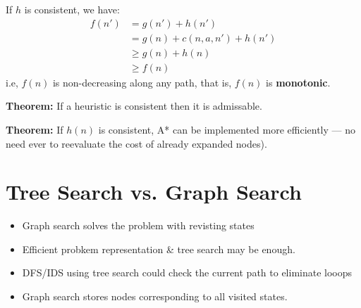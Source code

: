 \documentclass{article}
\begin{document}
If $h$ is consistent, we have:
\begin{align*}
	f(n') &= g(n') + h(n') \\
		&= g(n) + c(n,a,n') + h(n') \\
		&\ge g(n) + h(n) \\
		&\ge f(n)
\end{align*}
i.e, $f(n)$ is non-decreasing along any path, that is, $f(n)$ is \textbf{monotonic}.

\smallskip
\textbf{Theorem:} If a heuristic is consistent then it is admissable.

\smallskip
\textbf{Theorem:} If $h(n)$ is consistent, A* can be implemented more efficiently --- no need ever to reevaluate the cost of already expanded nodes).

\section{Tree Search vs. Graph Search}
\begin{itemize}
	\item Graph search solves the problem with revisting states
	\item Efficient probkem representation \& tree search may be enough.
	\item DFS/IDS using tree search could check the current path to eliminate looops
	\item Graph search stores nodes corresponding to all visited states.
\end{itemize}
\end{document}
